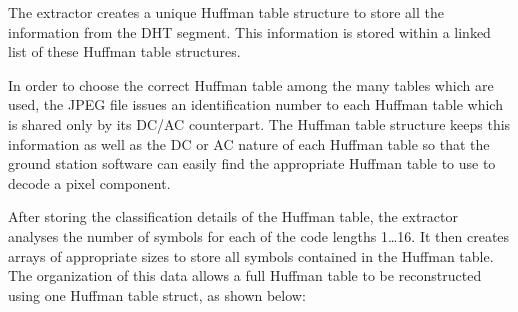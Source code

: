 The extractor creates a unique Huffman table structure to
store all the information from the DHT segment. This information
is stored within a linked list of these Huffman table structures.

In order to choose the correct Huffman table among the many
tables which are used, the JPEG file issues an identification number
to each Huffman table which is shared only by its DC/AC counterpart.
The Huffman table structure keeps this information as well as the
DC or AC nature of each Huffman table so that the ground station
software can easily find the appropriate Huffman table to use to
decode a pixel component.

After storing the classification details of the Huffman table,
the extractor analyses the number of symbols for each
of the code lengths 1\ldots16. It then creates arrays
of appropriate sizes to store all symbols contained in 
the Huffman table. The organization of this data allows
a full Huffman table to be reconstructed using one
Huffman table struct, as shown below:

